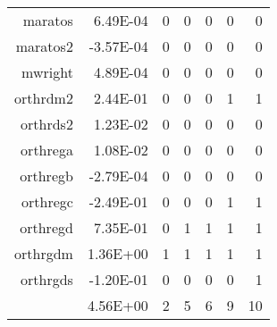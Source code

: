 \begin{table}[htbp]
\begin{tabular}{rrrrrrr}
    maratos & 6.49E-04 & 0     & 0     & 0     & 0     & 0 \\
    maratos2 & -3.57E-04 & 0     & 0     & 0     & 0     & 0 \\
    mwright & 4.89E-04 & 0     & 0     & 0     & 0     & 0 \\
    orthrdm2 & 2.44E-01 & 0     & 0     & 0     & 1     & 1 \\
    orthrds2 & 1.23E-02 & 0     & 0     & 0     & 0     & 0 \\
    orthrega & 1.08E-02 & 0     & 0     & 0     & 0     & 0 \\
    orthregb & -2.79E-04 & 0     & 0     & 0     & 0     & 0 \\
    orthregc & -2.49E-01 & 0     & 0     & 0     & 1     & 1 \\
    orthregd & 7.35E-01 & 0     & 1     & 1     & 1     & 1 \\
    orthrgdm & 1.36E+00 & 1     & 1     & 1     & 1     & 1 \\
    orthrgds & -1.20E-01 & 0     & 0     & 0     & 0     & 1 \\
          & 4.56E+00 & 2     & 5     & 6     & 9     & 10 \\
    \bottomrule
    \end{tabular}%
  \label{tab:addlabel}%
\end{table}%
